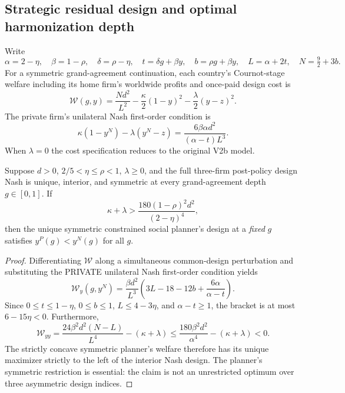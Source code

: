 \subsection{Strategic residual design and optimal harmonization depth}

Write
\[
\alpha=2-\eta,\quad \beta=1-\rho,\quad \delta=\rho-\eta,\quad
t=\delta g+\beta y,\quad b=\rho g+\beta y,\quad
L=\alpha+2t,\quad N=\tfrac92+3b.
\]
For a symmetric grand-agreement continuation, each country's Cournot-stage
welfare including its home firm's worldwide profits and once-paid design cost is
\[
 \mathcal W(g,y)=\frac{Nd^2}{L^2}
 -\frac{\kappa}{2}(1-y)^2
 -\frac{\lambda}{2}(y-z)^2.
\]
The private firm's unilateral Nash first-order condition is
\[
 \kappa(1-y^N)-\lambda(y^N-z)=
 \frac{6\beta\alpha d^2}{(\alpha-t)L^3}.
\]
When $\lambda=0$ the cost specification reduces to the original V2b model.

\begin{proposition}
Suppose $d>0$, $2/5<\eta\le\rho<1$, $\lambda\ge0$,
and the full three-firm post-policy design Nash is unique, interior,
and symmetric at every grand-agreement depth $g\in[0,1]$.
If
\[
 \kappa+\lambda>
 \frac{180(1-\rho)^2d^2}{(2-\eta)^4},
\]
then the unique symmetric constrained social planner's design at a
\emph{fixed} $g$ satisfies $y^P(g)<y^N(g)$ for all $g$.
\end{proposition}
\begin{proof}
Differentiating $\mathcal W$ along a simultaneous common-design perturbation
and substituting the PRIVATE unilateral Nash first-order condition yields
\[
 \mathcal W_y(g,y^N)
 =\frac{\beta d^2}{L^3}
 \left(3L-18-12b+\frac{6\alpha}{\alpha-t}\right).
\]
Since $0\le t\le1-\eta$, $0\le b\le1$,
$L\le4-3\eta$, and $\alpha-t\ge1$, the bracket is at most
$6-15\eta<0$. Furthermore,
\[
 \mathcal W_{yy}=
 \frac{24\beta^2d^2(N-L)}{L^4}-(\kappa+\lambda)
 \le \frac{180\beta^2d^2}{\alpha^4}-(\kappa+\lambda)<0.
\]
The strictly concave symmetric planner's welfare therefore has its
unique maximizer strictly to the left of the interior Nash design.
The planner's symmetric restriction is essential: the claim is not an
unrestricted optimum over three asymmetric design indices.
\end{proof}

